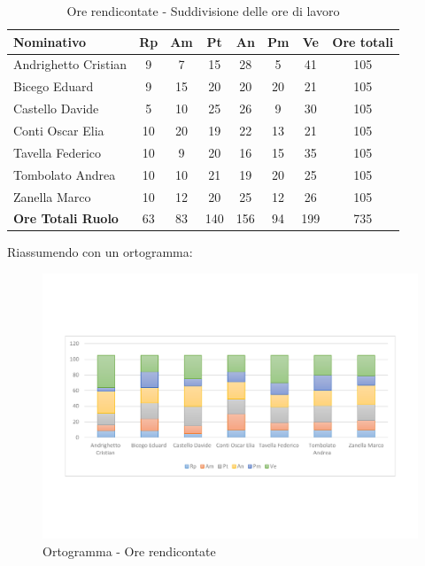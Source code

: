 \documentclass[../PianoProgetto.tex]{subfiles}
\begin{document}
	\begin{table}[h]
		\begin{tabularx}{\textwidth}{l  * {6}{C}  c}
			\toprule
			\textbf{Nominativo} & \textbf{Rp} & \textbf{Am} & \textbf{Pt} 
						& \textbf{An} & \textbf{Pm} & \textbf{Ve} & \textbf{Ore totali} \\
			\midrule
			Andrighetto Cristian & 9 & 7 & 15 & 28 & 5 & 41 &	105 \\
			Bicego Eduard & 9 & 15 & 20 & 20 & 20 & 21 & 105 \\
			Castello Davide & 5 & 10 & 25 & 26 & 9 & 30 & 105 \\
			Conti Oscar Elia & 10 & 20 & 19 & 22 & 13 & 21 & 105 \\
			Tavella Federico &	10 & 9 & 20 & 16 & 15 & 35 & 105 \\
			Tombolato Andrea & 10 & 10 & 21 & 19 & 20 & 25 & 105 \\
			Zanella Marco & 10 & 12 & 20 & 25 & 12 & 26 & 105 \\
			\midrule			
			\textbf{Ore Totali Ruolo} & 63 & 83 & 140 & 156 & 94 & 199 & 735 \\
			\bottomrule
		\end{tabularx}
		\caption{Ore rendicontate - Suddivisione delle ore di lavoro}
		\label{tab:rendicontate_ore}
	\end{table}
	
\newpage
\vfill		
	Riassumendo con un ortogramma:

	\begin{figure}[!h]
		\centering
		\includegraphics[width=\textwidth , trim=2cm 5cm 2cm 5cm]{grafici/Riepilogo/Rendicontate/ore-persona}
			\caption{Ortogramma - Ore rendicontate}
		\label{fig:BarChart-rendicontate_ore}
	\end{figure}
	
\end{document}
